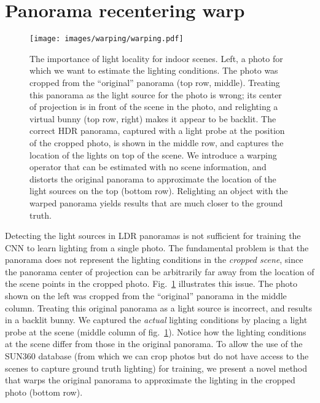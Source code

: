 \section{Panorama recentering warp}
\label{sec:warping}

\begin{figure}[!t]
\centering
\texttt{[image: images/warping/warping.pdf]}
\caption{The importance of light locality for indoor scenes. Left, a photo for which we want to estimate the lighting conditions. The photo was cropped from the ``original'' panorama (top row, middle). Treating this panorama as the light source for the photo is wrong; its center of projection is in front of the scene in the photo, and relighting a virtual bunny (top row, right) makes it appear to be backlit. The correct HDR panorama, captured with a light probe at the position of the cropped photo, is shown in the middle row, and captures the location of the lights on top of the scene. We introduce a warping operator that can be estimated with no scene information, and distorts the original panorama to approximate the location of the light sources on the top (bottom row). Relighting an object with the warped panorama yields results that are much closer to the ground truth.}
\label{f:warping-problem}
\end{figure}

Detecting the light sources in LDR panoramas is not sufficient for training the CNN to learn lighting from a single photo. The fundamental problem is that the panorama does not represent the lighting conditions in the \emph{cropped scene}, since the panorama center of projection can be arbitrarily far away from the location of the scene points in the cropped photo. Fig.~\ref{f:warping-problem} illustrates this issue. The photo shown on the left was cropped from the ``original'' panorama in the middle column. Treating this original panorama as a light source is incorrect, and results in a backlit bunny. We captured the \emph{actual} lighting conditions by placing a light probe at the scene (middle column of fig.~\ref{f:warping-problem}). Notice how the lighting conditions at the scene differ from those in the original panorama. To allow the use of the SUN360 database (from which we can crop photos but do not have access to the scenes to capture ground truth lighting) for training, we present a novel method that warps the original panorama to approximate the lighting in the cropped photo (bottom row). 

